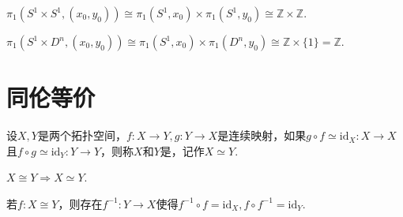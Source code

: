 \begin{instance}
    $\pi_1(S^1 \times S^1, (x_0, y_0)) \cong \pi_1(S^1, x_0) \times \pi_1(S^1, y_0) \cong \mathbb{Z} \times \mathbb{Z}$.
\end{instance}

\begin{instance}
    $\pi_1(S^1 \times D^n, (x_0, y_0)) \cong \pi_1(S^1, x_0) \times \pi_1(D^n, y_0) \cong \mathbb{Z} \times \{1\} = \mathbb{Z}$.
\end{instance}

\section{同伦等价}

\begin{definition}[同伦等价][def:10.16]
    设$X, Y$是两个拓扑空间，$f: X \to Y, g: Y \to X$是连续映射，如果$g \circ f \simeq \mathrm{id}_X: X \to X$且$f \circ g \simeq \mathrm{id}_Y: Y \to Y$，则称$X$和$Y$是，记作$X \simeq Y$.
\end{definition}

\begin{remark}
    $X \cong Y \Rightarrow X \simeq Y$.\par
    若$f: X \cong Y$，则存在$f^{-1}: Y \to X$使得$f^{-1} \circ f = \mathrm{id}_X, f \circ f^{-1} = \mathrm{id}_Y$.
\end{remark}

